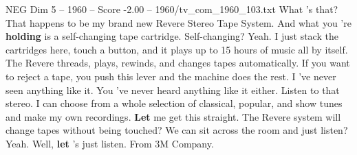 \begin{textsample}{NEG Dim 5 – 1960 – Score -2.00 – 1960/tv\_com\_1960\_103.txt}  \label{ex:f5_neg_017}
What 's that?
That happens to be my brand new Revere Stereo Tape System.
And what you 're \textbf{holding} is a self-changing tape cartridge.
Self-changing?
Yeah.
I just stack the cartridges here, touch a button, and it plays up to 15 hours of music all by itself.
The Revere threads, plays, rewinds, and changes tapes automatically.
If you want to reject a tape, you push this lever and the machine does the rest.
I 've never seen anything like it.
You 've never heard anything like it either.
Listen to that stereo.
I can choose from a whole selection of classical, popular, and show tunes and make my own recordings. \textbf{Let} me get this straight.
The Revere system will change tapes without being touched?
We can sit across the room and just listen?
Yeah.
Well, \textbf{let} 's just listen.
From 3M Company.

\end{textsample}
